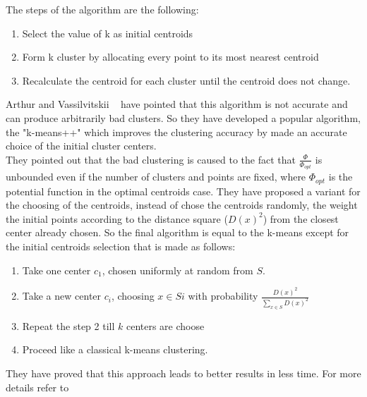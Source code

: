 \documentclass{standalone}
\begin{document}
		The steps of the algorithm are the following: 
		\begin{enumerate}
			\item Select the value of k as initial centroids
			\item Form k cluster by allocating every point to its most nearest centroid
			\item Recalculate the centroid for each cluster until the centroid does not change.
			
		\end{enumerate}
		
		Arthur and Vassilvitskii ~\cite{Arthur2007} have pointed that this algorithm is not accurate and can produce arbitrarily bad clusters. So they have developed a popular algorithm, the "k-means++" which improves the clustering accuracy by made an accurate choice of the initial cluster centers.\\ 
		They pointed out that the bad clustering is caused to the fact that $\frac{\Phi}{\Phi_{opt}}$ is unbounded even if the number of clusters and points are fixed, where $\Phi_{opt}$ is the potential function in the optimal centroids case. They have proposed a variant for the choosing of the centroids, instead of chose the centroids randomly, the weight the initial points according to the distance square ($D(x)^2$) from the closest center already chosen. So the final algorithm is equal to the k-means except for the initial centroids selection that is made as follows: 
		\begin{enumerate}
			\item Take one center $c_1$, chosen uniformly at random from $S$.
			
			\item  Take a new center $c_i$, choosing $x \in Si$ with probability $\frac{D(x)^2}{\sum _{x \in S} D(x)^2}$
			
			\item Repeat the step 2 till $k$ centers are choose
			
			\item Proceed like a classical k-means clustering.
			
		\end{enumerate}
		
		They have proved that this approach leads to better results in less time. For more details refer to ~\cite{Arthur2007}
\end{document}
